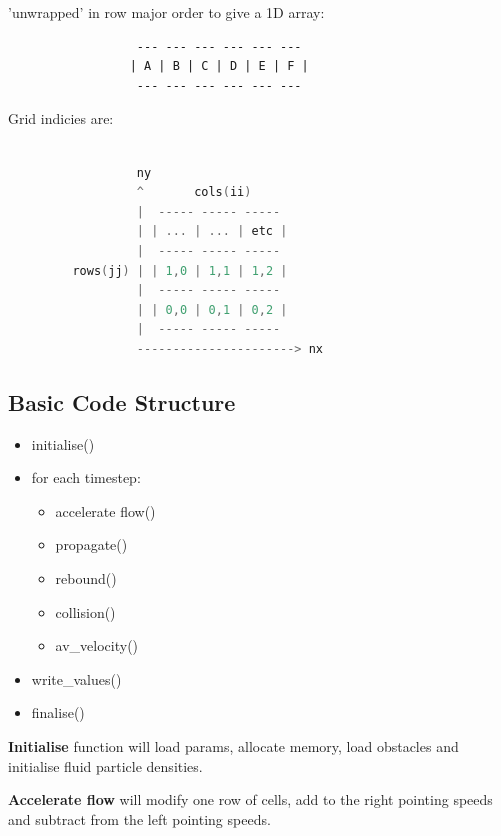 \documentclass{article}
\begin{document}
'unwrapped' in row major order to give a 1D array:
\begin{lstlisting}
                  --- --- --- --- --- ---
                 | A | B | C | D | E | F |
                  --- --- --- --- --- ---                      
\end{lstlisting}

Grid indicies are:
\begin{lstlisting}[language=C]
                          
                  ny
                  ^       cols(ii)
                  |  ----- ----- -----
                  | | ... | ... | etc |
                  |  ----- ----- -----
         rows(jj) | | 1,0 | 1,1 | 1,2 |
                  |  ----- ----- -----
                  | | 0,0 | 0,1 | 0,2 |
                  |  ----- ----- -----
                  ----------------------> nx
\end{lstlisting}


\subsection{Basic Code Structure}

\begin{itemize}
    \item initialise()
    \item for each timestep:
    \begin{itemize}
        \item accelerate flow()
        \item propagate()
        \item rebound()
        \item collision()
        \item av\_velocity()
    \end{itemize}
    \item write\_values()
    \item finalise()
\end{itemize}

\textbf{Initialise} function will load params, allocate memory, load obstacles and initialise fluid particle densities.

\textbf{Accelerate flow} will modify one row of cells, add to the right pointing speeds and subtract from the left pointing speeds.
\end{document}
